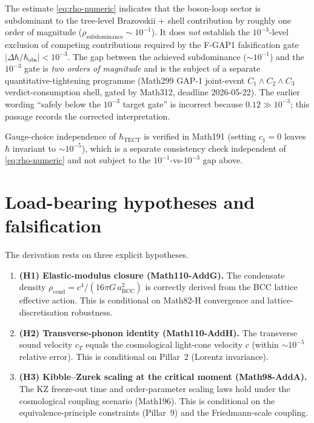 \begin{remark}\label{rmk:1eminus3-gap}
The estimate \eqref{eq:rho-numeric} indicates that the boson-loop
sector is subdominant to the tree-level Brazovskii + shell
contribution by roughly one order of magnitude
($\rho_{\mathrm{subdominance}} \sim 10^{-1}$). It does \emph{not}
establish the $10^{-3}$-level exclusion of competing contributions
required by the F-GAP1 falsification gate
$|\Delta\hbar/\hbar_{\mathrm{obs}}| < 10^{-3}$. The gap between the
achieved subdominance ($\sim 10^{-1}$) and the $10^{-3}$ gate is
\emph{two orders of magnitude} and is the subject of a separate
quantitative-tightening programme (Math299 GAP-1 joint-event
$C_1 \wedge C_2 \wedge C_3$ verdict-consumption shell, gated by
Math312, deadline 2026-05-22). The earlier wording ``safely below the
$10^{-3}$ target gate'' is incorrect because $0.12 \gg 10^{-3}$;
this passage records the corrected interpretation.
\end{remark}

Gauge-choice independence of $\hbar_{\mathrm{TECT}}$ is verified in
Math191 (setting $c_1 = 0$ leaves $\hbar$ invariant to $\sim 10^{-5}$),
which is a separate consistency check independent of
\eqref{eq:rho-numeric} and not subject to the
$10^{-1}$-vs-$10^{-3}$ gap above.

\section{Load-bearing hypotheses and falsification}
\label{sec:hypotheses}

The derivation rests on three explicit hypotheses.

\begin{enumerate}
\item \textbf{(H1) Elastic-modulus closure (Math110-AddG).}
  The condensate density
  $\rho_{\mathrm{cond}} = c^4/(16\pi G\,a_{\mathrm{BCC}}^2)$ is
  correctly derived from the BCC lattice effective action. This is
  conditional on Math82-H convergence and lattice-discretisation
  robustness.

\item \textbf{(H2) Transverse-phonon identity (Math110-AddH).}
  The transverse sound velocity $c_T$ equals the cosmological
  light-cone velocity $c$ (within $\sim 10^{-5}$ relative error).
  This is conditional on Pillar~2 (Lorentz invariance).

\item \textbf{(H3) Kibble--Zurek scaling at the critical moment
  (Math98-AddA).}
  The KZ freeze-out time and order-parameter scaling laws hold under
  the cosmological coupling scenario (Math196). This is conditional
  on the equivalence-principle constraints (Pillar~9) and the
  Friedmann-scale coupling.
\end{enumerate}

